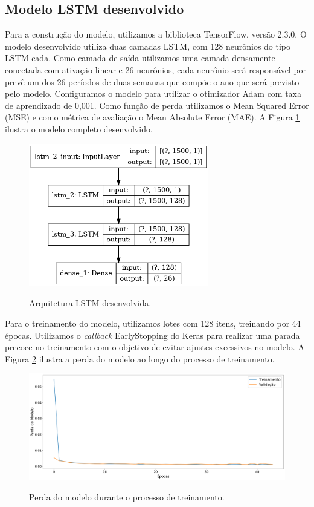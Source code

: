 \subsection{Modelo LSTM desenvolvido}

Para a construção do modelo, utilizamos a biblioteca TensorFlow, versão 2.3.0. O modelo desenvolvido utiliza duas camadas LSTM, com 128 neurônios do tipo LSTM cada. Como camada de saída utilizamos uma camada densamente conectada com  ativação linear e 26 neurônios, cada neurônio será responsável por prevê um dos 26 períodos de duas semanas que compõe o ano que será previsto pelo modelo. Configuramos o modelo para utilizar o otimizador Adam com taxa de aprendizado de 0,001. Como função de perda utilizamos o Mean Squared Error (MSE) e como métrica de avaliação o Mean Absolute Error (MAE). A Figura \ref{fig:modelo_lstm} ilustra o modelo completo desenvolvido. 

\begin{figure}[H]
\centering
\caption{Arquitetura LSTM desenvolvida.}
\includegraphics[width=0.7\textwidth]{figuras/lstm_model.png}
\label{fig:modelo_lstm}
\end{figure}

Para o treinamento do modelo, utilizamos lotes com 128 itens, treinando por 44 épocas. Utilizamos o \textit{callback} EarlyStopping do Keras para realizar uma parada precoce no treinamento com o objetivo de evitar ajustes excessivos no modelo. A Figura \ref{fig:perda_modelo} ilustra a perda do modelo ao longo do processo de treinamento. 

\begin{figure}[H]
\centering
\caption{Perda do modelo durante o processo de treinamento.}
\includegraphics[width=\textwidth]{figuras/grafico_de_perda.png}
\label{fig:perda_modelo}
\end{figure}